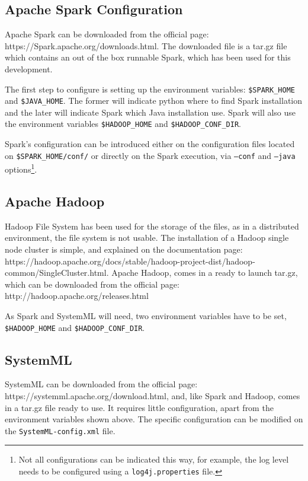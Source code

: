 \documentclass[11pt]{book} %
\newcommand{\code}[1]{\colorbox{codegray}{\texttt{#1}}}
\begin{document}
    \subsection{Apache Spark Configuration}

      Apache Spark can be downloaded from the official page: https://Spark.apache.org/downloads.html. The downloaded file is a tar.gz file which contains an out of the box runnable Spark, which has been used for this development.

      The first step to configure is setting up the environment variables: \code{\$SPARK\_HOME} and \code{\$JAVA\_HOME}. The former will indicate python where to find Spark installation and the later will indicate Spark which Java installation use. Spark will also use the environment variables \code{\$HADOOP\_HOME} and \code{\$HADOOP\_CONF\_DIR}.

      Spark's configuration can be introduced either on the configuration files located on \code{\$SPARK\_HOME/conf/} or directly on the Spark execution, via \code{--conf} and \code{--java} options\footnote{Not all configurations can be indicated this way, for example, the log level needs to be configured using a \code{log4j.properties} file.}.


    \subsection{Apache Hadoop}

      Hadoop File System has been used for the storage of the files, as in a distributed environment, the file system is not usable. The installation of a Hadoop single node cluster is simple, and explained on the documentation page: https://hadoop.apache.org/docs/stable/hadoop-project-dist/hadoop-common/SingleCluster.html. Apache Hadoop, comes in a ready to launch tar.gz, which can be downloaded from the official page: http://hadoop.apache.org/releases.html

      As Spark and SystemML will need, two environment variables have to be set, \code{\$HADOOP\_HOME} and \code{\$HADOOP\_CONF\_DIR}.

    \subsection{SystemML}

      SystemML can be downloaded from the official page: https://systemml.apache.org/download.html, and, like Spark and Hadoop, comes in a tar.gz file ready to use. It requires little configuration, apart from the environment variables shown above. The specific configuration can be modified on the \code{SystemML-config.xml} file.
\end{document}
